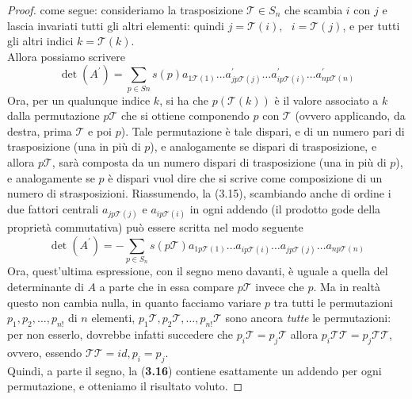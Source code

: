 \begin{enumerate}
\begin{proof}
			come segue: consideriamo la trasposizione $\mathcal{T}\in S_n$ che
			scambia $i$ con $j$ e lascia invariati tutti gli altri elementi:
			quindi $j=\mathcal{T}(i), \text{ } i=\mathcal{T}(j)$, e per tutti
			gli altri indici $k =\mathcal{T}(k)$.\\
			Allora possiamo scrivere
			\begin{equation}
				\det(A^\prime) = \sum_{p\in Sn} s(p) a_{1\mathcal{T}(1)}\dots
				a^\prime_{jp\mathcal{T}(j)}\dots a^\prime_{ip\mathcal{T}(i)}
				\dots a^\prime_{np\mathcal{T}(n)} 
			\end{equation}
			Ora, per un qualunque indice $k$, si ha che $p(\mathcal{T}(k))$ è
			il valore associato a $k$ dalla permutazione $p \mathcal{T}$ che si
			ottiene componendo $p$ con $\mathcal{T}$ (ovvero applicando, da
			destra, prima $\mathcal{T}$ e poi $p$). Tale permutazione è tale
			dispari, e di un numero pari di trasposizione (una in più di $p$),
			e analogamente se dispari di trasposizione, e allora
			$p\mathcal{T}$, sarà composta da un numero dispari di trasposizione
			(una in più di $p$), e analogamente se $p$ è dispari vuol dire che
			si scrive come composizione di un numero di strasposizioni.
			Riassumendo, la (3.15), scambiando anche di ordine i due fattori
			centrali $a_{j p\mathcal{T}(j)}$ e $a_{ip\mathcal{T}(i)}$ in ogni
			addendo (il prodotto gode della proprietà commutativa) può essere
			scritta nel modo seguente
			\begin{equation}
				\det(A^\prime) = -\sum_{p\in S_n} s(p\mathcal{T})
				a_{1p\mathcal{T}(1)} \dots a_{i p\mathcal{T}(i)} \dots a_{j
				p\mathcal{T}(j)} \dots a_{n p\mathcal{T}(n)}
			\end{equation}
			Ora, quest'ultima espressione, con il segno meno davanti, è uguale
			a quella del determinante di $A$ a parte che in essa compare
			$p\mathcal{T}$ invece che $p$. Ma in realtà questo non cambia
			nulla, in quanto facciamo variare $p$ tra tutti le permutazioni
			$p_1,p_2,\dots,p_{n!}$ di $n$ elementi, $p_1\mathcal{T},
			p_2\mathcal{T},\dots,p_{n!}\mathcal{T}$ sono ancora {\em tutte} le
			permutazioni: per non esserlo, dovrebbe infatti succedere che
                        $p_i\mathcal{T}=p_j\mathcal{T}$ allora
                        $p_i\mathcal{T}\mathcal{T}=p_j\mathcal{T}\mathcal{T}$, ovvero, essendo
                        $\mathcal{T}\mathcal{T}=id,p_i=p_j$.\\
                        Quindi, a parte il segno, la ({\bf 3.16}) contiene esattamente un
                        addendo per ogni permutazione, e otteniamo il risultato voluto.
		\end{proof}
\end{enumerate}
